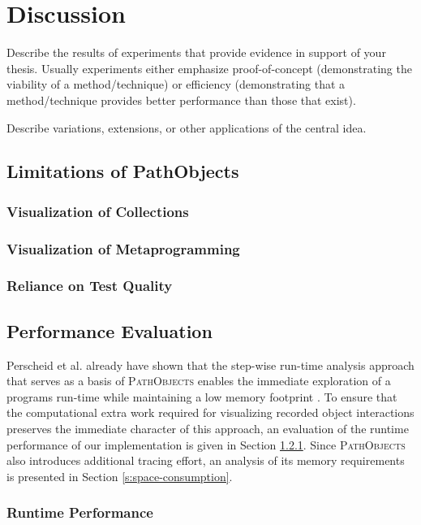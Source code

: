\chapter{Discussion}
\label{c:discussion}

Describe the results of experiments that provide evidence in support of your thesis. Usually experiments either emphasize proof-of-concept (demonstrating the viability of a method/technique) or efficiency (demonstrating that a method/technique provides better performance than those that exist).

Describe variations, extensions, or other applications of the central idea.

\section{Limitations of PathObjects}
\subsection{Visualization of Collections}
\subsection{Visualization of Metaprogramming}
\subsection{Reliance on Test Quality}

\section{Performance Evaluation}
Perscheid et al. already have shown that the step-wise run-time analysis approach that serves as a basis of \textsc{PathObjects} enables the immediate exploration of a programs run-time while maintaining a low memory footprint  \cite{perscheid_immediacy_2010}.
To ensure that the computational extra work required for visualizing recorded object interactions preserves the immediate character of this approach, an evaluation of the runtime performance of our implementation is given in Section \ref{s:runtime-performance}.
Since \textsc{PathObjects} also introduces additional tracing effort, an analysis of its memory requirements is presented in Section \ref{s:space-consumption}.

\subsection{Runtime Performance}
\label{s:runtime-performance}

